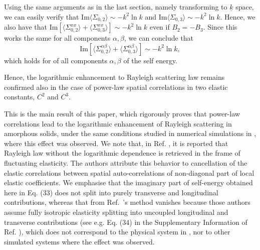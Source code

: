 \documentclass[twoside,twocolumn,9pt]{article}
\begin{document}
Using the same arguments as in the last section, namely transforming to $\underline{k}$ space, we can easily verify that $\text{Im}\langle\Sigma_{0,2}\rangle\sim-k^2\ln k$ and $\text{Im}\langle\Sigma_{0,3}\rangle\sim-k^2\ln k$. Hence, we also have that $\text{Im}[\langle\Sigma_{0,2}^{xx}\rangle+\langle\Sigma_{0,3}^{xx}\rangle]\sim-k^2\ln k$ even if $B_2=-B_3$. Since this works the same for all components $\alpha, \beta$, we can conclude that
\begin{equation}
\text{Im}[\langle\Sigma_{0,2}^{\alpha\beta}\rangle+\langle\Sigma_{0,3}^{\alpha\beta}\rangle]\sim-k^2\ln k,
\end{equation}
which holds for of all components $\alpha,\beta$ of the self energy.


Hence, the logarithmic enhancement to Rayleigh scattering law remains confirmed also in the case of power-law spatial correlations in two elastic constants, $C^{2}$ and $C^{3}$.

This is the main result of this paper, which rigorously proves that power-law correlations lead to the logarithmic enhancement of Rayleigh scattering in amorphous solids, under the same conditions studied in numerical simulations in \cite{Gelin2016}, where this effect was observed. We note that, in Ref. \cite{Lemaitre2019}, it is reported that Rayleigh law without the logarithmic dependence is retrieved in the frame of fluctuating elasticity. The authors attribute this behavior to cancellation of the elastic correlations between spatial auto-correlations of non-diagonal part of local elastic coefficients. We emphasise that the imaginary part of self-energy obtained here in Eq. (33) does not split into purely transverse and longitudinal contributions, whereas that from Ref.~\cite{Lemaitre2019}'s method vanishes because those authors assume fully isotropic elasticity splitting into uncoupled longitudinal and transverse contributions (see e.g. Eq. (34) in the Supplementary Information of Ref. \cite{Lemaitre2019}), which does not correspond to the physical system in \cite{Gelin2016}, nor to other simulated systems where the effect was observed. 

\end{document}
